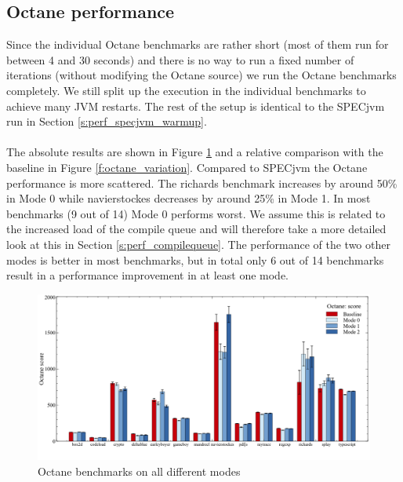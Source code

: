 \subsection{Octane performance}
\label{s:perf_octane}
Since the individual Octane benchmarks are rather short (most of them run for between 4 and 30 seconds) and there is no way to run a fixed number of iterations (without modifying the Octane source) we run the Octane benchmarks completely. We still split up the execution in the individual benchmarks to achieve many JVM restarts. The rest of the setup is identical to the SPECjvm run in Section \ref{s:perf_specjvm_warmup}.
\\\\
The absolute results are shown in Figure \ref{f:octane} and a relative comparison with the baseline in Figure \ref{f:octane_variation}.
Compared to SPECjvm the Octane performance is more scattered. The richards benchmark increases by around 50\% in Mode 0 while navierstockes decreases by around 25\% in Mode 1. In most benchmarks (9 out of 14) Mode 0 performs worst.
We assume this is related to the increased load of the compile queue and will therefore take a more detailed look at this in Section \ref{s:perf_compilequeue}. The performance of the two other modes is better in most benchmarks, but in total only 6 out of 14 benchmarks result in a performance improvement in at least one mode.

\begin{figure}[ht]
  \begin{center}
    \centering
    \includegraphics[width=1.0\textwidth]{figures/octane.png}
    \caption{Octane benchmarks on all different modes}
    \label{f:octane}
  \end{center}
\end{figure}


